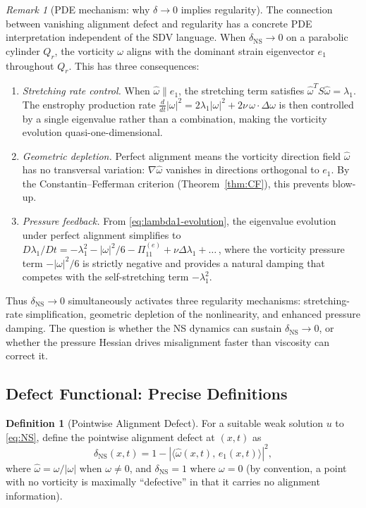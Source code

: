 \documentclass[11pt]{article}
\theoremstyle{definition}
\newtheorem{definition}[theorem]{Definition}
\theoremstyle{remark}
\newtheorem{remark}[theorem]{Remark}
\begin{document}
\begin{remark}[PDE mechanism: why $\delta \to 0$ implies regularity]
\label{rem:pde-mechanism}
The connection between vanishing alignment defect and regularity has a concrete
PDE interpretation independent of the SDV language.  When $\delta_{\mathrm{NS}}
\to 0$ on a parabolic cylinder $Q_r$, the vorticity $\omega$ aligns with the
dominant strain eigenvector $e_1$ throughout $Q_r$.  This has three consequences:
\begin{enumerate}[nosep]
  \item \emph{Stretching rate control.}  When $\hat\omega \| e_1$, the stretching
    term satisfies $\hat\omega^T S\hat\omega = \lambda_1$.  The enstrophy
    production rate $\frac{d}{dt}|\omega|^2 = 2\lambda_1|\omega|^2 +
    2\nu\,\omega\cdot\Delta\omega$ is then controlled by a single eigenvalue
    rather than a combination, making the vorticity evolution quasi-one-dimensional.
  \item \emph{Geometric depletion.}  Perfect alignment means the vorticity direction
    field $\hat\omega$ has no transversal variation: $\nabla\hat\omega$ vanishes in
    directions orthogonal to $e_1$.  By the Constantin--Fefferman criterion
    (Theorem~\ref{thm:CF}), this prevents blow-up.
  \item \emph{Pressure feedback.}  From \eqref{eq:lambda1-evolution}, the eigenvalue
    evolution under perfect alignment simplifies to $D\lambda_1/Dt = -\lambda_1^2 -
    |\omega|^2/6 - \Pi_{11}^{(e)} + \nu\Delta\lambda_1 + \ldots$\,, where the
    vorticity pressure term $-|\omega|^2/6$ is strictly negative and provides
    a natural damping that competes with the self-stretching term $-\lambda_1^2$.
\end{enumerate}
Thus $\delta_{\mathrm{NS}} \to 0$ simultaneously activates three regularity
mechanisms: stretching-rate simplification, geometric depletion of the nonlinearity,
and enhanced pressure damping.  The question is whether the NS dynamics can
sustain $\delta_{\mathrm{NS}} \to 0$, or whether the pressure Hessian drives
misalignment faster than viscosity can correct it.
\end{remark}

\subsection{Defect Functional: Precise Definitions}

\begin{definition}[Pointwise Alignment Defect]
\label{def:pointwise-defect}
For a suitable weak solution $u$ to \eqref{eq:NS}, define the pointwise alignment
defect at $(x,t)$ as
\begin{equation}\label{eq:delta-NS}
  \delta_{\mathrm{NS}}(x,t) = 1 - |\langle \hat\omega(x,t),\, e_1(x,t)\rangle|^2,
\end{equation}
where $\hat\omega = \omega/|\omega|$ when $\omega \neq 0$, and
$\delta_{\mathrm{NS}} = 1$ where $\omega = 0$ (by convention, a point with no
vorticity is maximally ``defective'' in that it carries no alignment information).
\end{definition}
\end{document}
